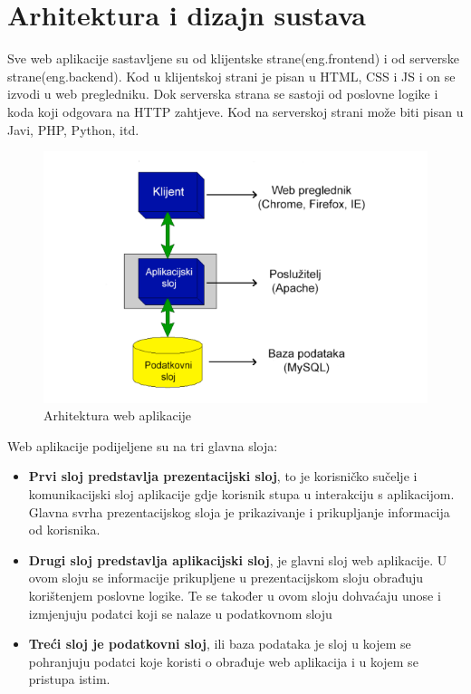 \chapter{Arhitektura i dizajn sustava}


Sve web aplikacije sastavljene su od klijentske strane(eng.frontend) i od serverske strane(eng.backend). Kod u klijentskoj strani je pisan u HTML, CSS i JS i on se izvodi u web pregledniku. Dok serverska strana se sastoji od poslovne logike i koda koji odgovara na HTTP zahtjeve. Kod na serverskoj strani može biti pisan u Javi, PHP, Python, itd.



\begin{figure}[H]
	
	\includegraphics[width=\textwidth]{slike/webAplikacija.png} %
	\centering
	\caption{Arhitektura web aplikacije}
	\label{fig:arhitekturaWebApp}
\end{figure}
Web aplikacije podijeljene su na tri glavna sloja:

\begin{itemize}
	\item \textbf{Prvi sloj predstavlja prezentacijski sloj}, to je korisničko sučelje i komunikacijski sloj aplikacije gdje korisnik stupa u interakciju s aplikacijom. Glavna svrha prezentacijskog sloja je prikazivanje i prikupljanje informacija od korisnika.
	\item\textbf{Drugi sloj predstavlja aplikacijski sloj}, je glavni sloj web aplikacije. U ovom sloju se informacije prikupljene u prezentacijskom sloju obrađuju korištenjem poslovne logike. Te se također u ovom sloju dohvaćaju unose i izmjenjuju podatci koji se nalaze u podatkovnom sloju
	\item\textbf{Treći sloj je podatkovni sloj}, ili baza podataka je sloj u kojem se pohranjuju podatci koje koristi o obrađuje web aplikacija i u kojem se pristupa istim.
\end{itemize} 

